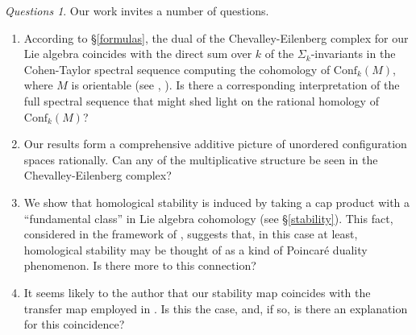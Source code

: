 \documentclass{compositio}
\theoremstyle{definition}\newtheorem{definition}{Definition}[section]
\theoremstyle{theorem}\newtheorem{lemma}[definition]{Lemma}
\theoremstyle{remark}\newtheorem*{conventions}{Conventions}
\theoremstyle{remark}\newtheorem*{acknowledgments}{Acknowledgments}
\theoremstyle{remark}\newtheorem*{outline}{Outline}
\theoremstyle{remark}\newtheorem*{questions}{Questions}
\theoremstyle{remark}\newtheorem{example}[definition]{Example}
\theoremstyle{definition}\newtheorem{construction}[definition]{Construction}
\theoremstyle{definition}\newtheorem*{convention}{Convention}
\theoremstyle{definition}\newtheorem*{conjecture}{Conjecture}
\theoremstyle{theorem}\newtheorem{theorem}[definition]{Theorem}
\theoremstyle{theorem}\newtheorem{paradigm}[definition]{Paradigm}
\theoremstyle{remark}\newtheorem{remark}[definition]{Remark}
\theoremstyle{corollary}\newtheorem{corollary}[definition]{Corollary}
\theoremstyle{theorem}\newtheorem{proposition}[definition]{Proposition}
\theoremstyle{definition}\newtheorem{question}[definition]{Question}
\begin{document}
\begin{questions}
Our work invites a number of questions.
\begin{enumerate}
\item According to \S\ref{formulas}, the dual of the Chevalley-Eilenberg complex for our Lie algebra coincides with the direct sum over $k$ of the $\Sigma_k$-invariants in the Cohen-Taylor spectral sequence  computing the cohomology of ${\mathrm{Conf}}_k(M)$, where $M$ is orientable (see \cite{CohenTaylor}, \cite{Totaro}). Is there a corresponding interpretation of the full spectral sequence that might shed light on the rational homology of ${\mathrm{Conf}}_k(M)$? 
\item Our results form a comprehensive additive picture of unordered configuration spaces rationally. Can any of the multiplicative structure be seen in the Chevalley-Eilenberg complex?
\item We show that homological stability is induced by taking a cap product with a ``fundamental class'' in Lie algebra cohomology (see \S\ref{stability}). This fact, considered in the framework of \cite{AF}, suggests that, in this case at least, homological stability may be thought of as a kind of Poincar\'{e} duality phenomenon. Is there more to this connection?
\item It seems likely to the author that our stability map coincides with the transfer map employed in \cite{Church}. Is this the case, and, if so, is there an explanation for this coincidence?
\end{enumerate}
\end{questions}
\end{document}
